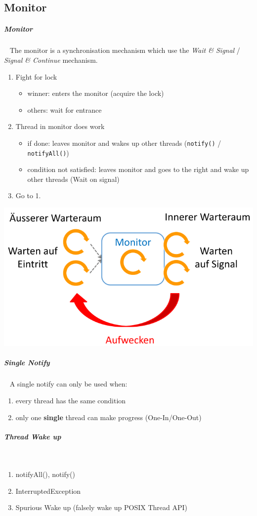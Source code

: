 \documentclass[8pt,twoside,landscape]{extarticle}
\begin{document}
\begin{multicols}{5}
\section{Monitor}
\label{sec:org584c3ae}
\subparagraph{Monitor} \
\label{sec:org4a9e73c}
The monitor is a synchronisation mechanism which use the \emph{Wait \& Signal} / \emph{Signal \& Continue} mechanism.
\begin{enumerate}
\item Fight for lock
\begin{itemize}
\item winner: enters the monitor (acquire the lock)
\item others: wait for entrance
\end{itemize}
\item Thread in monitor does work
\begin{itemize}
\item if done: leaves monitor and wakes up other threads (\texttt{notify()} / \texttt{notifyAll()})
\item condition not satisfied: leaves monitor and goes to the right and wake up other threads (Wait on signal)
\end{itemize}
\item Go to 1.
\end{enumerate}

{
\begin{center}
\includegraphics[width=.9\linewidth]{img/monitor.png}
\end{center}
\label{fig:monitor}
}
\subparagraph{Single Notify} \
\label{sec:org0bb8f11}
A single notify can only be used when:
\begin{enumerate}
\item every thread has the same condition
\item only one \textbf{single} thread can make progress (One-In/One-Out)
\end{enumerate}
\subparagraph{Thread Wake up} \
\label{sec:orge503457}
\begin{enumerate}
\item notifyAll(), notify()
\item InterruptedException
\item Spurious Wake up (falsely wake up POSIX Thread API)
\end{enumerate}

\end{multicols}
\end{document}
